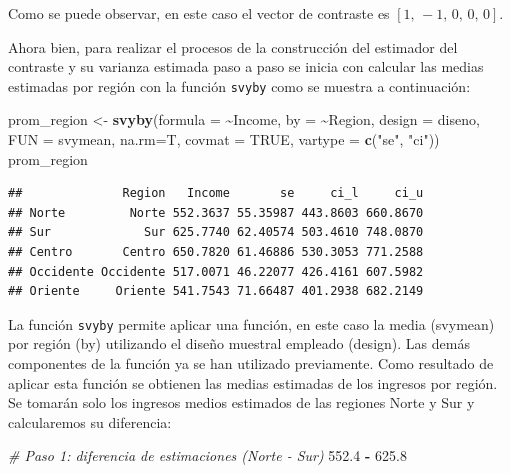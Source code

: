 \documentclass[
  12pt,
]{book}
\newenvironment{Shaded}{\begin{snugshade}}{\end{snugshade}}
\newcommand{\AttributeTok}[1]{\textcolor[rgb]{0.13,0.29,0.53}{#1}}
\newcommand{\CommentTok}[1]{\textcolor[rgb]{0.56,0.35,0.01}{\textit{#1}}}
\newcommand{\ConstantTok}[1]{\textcolor[rgb]{0.56,0.35,0.01}{#1}}
\newcommand{\FloatTok}[1]{\textcolor[rgb]{0.00,0.00,0.81}{#1}}
\newcommand{\FunctionTok}[1]{\textcolor[rgb]{0.13,0.29,0.53}{\textbf{#1}}}
\newcommand{\NormalTok}[1]{#1}
\newcommand{\OtherTok}[1]{\textcolor[rgb]{0.56,0.35,0.01}{#1}}
\newcommand{\SpecialCharTok}[1]{\textcolor[rgb]{0.81,0.36,0.00}{\textbf{#1}}}
\newcommand{\StringTok}[1]{\textcolor[rgb]{0.31,0.60,0.02}{#1}}
\begin{document}
Como se puede observar, en este caso el vector de contraste es \(\left[1,\,-1,\,0,\,0,\,0\right]\).

Ahora bien, para realizar el procesos de la construcción del estimador del contraste y su varianza estimada paso a paso se inicia con calcular las medias estimadas por región con la función \texttt{svyby} como se muestra a continuación:

\begin{Shaded}
\begin{Highlighting}[]
\NormalTok{prom\_region }\OtherTok{\textless{}{-}} \FunctionTok{svyby}\NormalTok{(}\AttributeTok{formula =} \SpecialCharTok{\textasciitilde{}}\NormalTok{Income,}
                      \AttributeTok{by =} \SpecialCharTok{\textasciitilde{}}\NormalTok{Region,}
                      \AttributeTok{design =}\NormalTok{ diseno,}
                      \AttributeTok{FUN =}\NormalTok{ svymean,}
                      \AttributeTok{na.rm=}\NormalTok{T,}
                      \AttributeTok{covmat =} \ConstantTok{TRUE}\NormalTok{,}
                      \AttributeTok{vartype =} \FunctionTok{c}\NormalTok{(}\StringTok{"se"}\NormalTok{, }\StringTok{"ci"}\NormalTok{))}
\NormalTok{prom\_region}
\end{Highlighting}
\end{Shaded}

\begin{verbatim}
##              Region   Income       se     ci_l     ci_u
## Norte         Norte 552.3637 55.35987 443.8603 660.8670
## Sur             Sur 625.7740 62.40574 503.4610 748.0870
## Centro       Centro 650.7820 61.46886 530.3053 771.2588
## Occidente Occidente 517.0071 46.22077 426.4161 607.5982
## Oriente     Oriente 541.7543 71.66487 401.2938 682.2149
\end{verbatim}

La función \texttt{svyby} permite aplicar una función, en este caso la media (svymean) por región (by) utilizando el diseño muestral empleado (design). Las demás componentes de la función ya se han utilizado previamente. Como resultado de aplicar esta función se obtienen las medias estimadas de los ingresos por región. Se tomarán solo los ingresos medios estimados de las regiones Norte y Sur y calcularemos su diferencia:

\begin{Shaded}
\begin{Highlighting}[]
\CommentTok{\# Paso 1: diferencia de estimaciones (Norte {-} Sur)}
\FloatTok{552.4} \SpecialCharTok{{-}} \FloatTok{625.8}
\end{Highlighting}
\end{Shaded}
\end{document}
